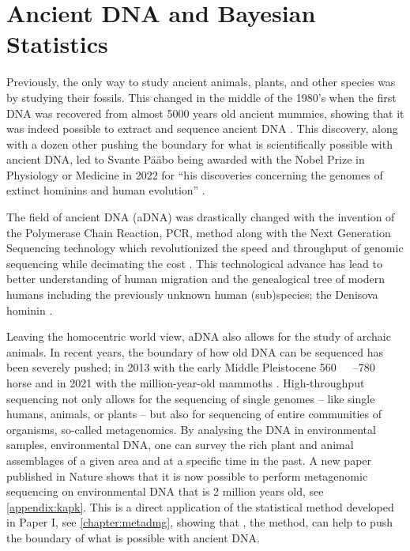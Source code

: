 \section{Ancient DNA and Bayesian Statistics}
\label{section:ancientDNA}

Previously, the only way to study ancient animals, plants, and other species was by studying their fossils. This changed in the middle of the 1980's when the first DNA was recovered from almost 5000 years old ancient mummies, showing that it was indeed possible to extract and sequence ancient DNA \autocite{paaboMolecularCloningAncient1985,paaboPreservationDNAAncient1985}. This discovery, along with a dozen other pushing the boundary for what is scientifically possible with ancient DNA, led to Svante Pääbo being awarded with the Nobel Prize in Physiology or Medicine in 2022 for ``his discoveries concerning the genomes of extinct hominins and human evolution'' \autocite{thenobelassemblyatkarolinskainstitutetNobelPrizePhysiology2022}.

The field of ancient DNA (aDNA) was drastically changed with the invention of the Polymerase Chain Reaction, PCR, method \autocite{mullisSpecificEnzymaticAmplification1986} along with the Next Generation Sequencing technology which revolutionized the speed and throughput of genomic sequencing while decimating the cost \autocite{slatkoOverviewNextGeneration2018}. This technological advance has lead to better understanding of human migration and the genealogical tree of modern humans including the previously unknown human (sub)species; the Denisova hominin \autocite{krauseCompleteMitochondrialDNA2010}.

Leaving the homocentric world view, aDNA also allows for the study of archaic animals. In recent years, the boundary of how old DNA can be sequenced has been severely pushed; in 2013 with the early Middle Pleistocene \qtyrange[range-phrase = --,range-units = single]{560}{780}{\kilo\year\BP} horse \autocite{orlandoRecalibratingEquusEvolution2013} and in 2021 with the million-year-old mammoths \autocite{vandervalkMillionyearoldDNASheds2021}. High-throughput sequencing not only allows for the sequencing of single genomes -- like single humans, animals, or plants -- but also for sequencing of entire communities of organisms, so-called metagenomics. By analysing the DNA in environmental samples, environmental DNA, one can survey the rich plant and animal assemblages of a given area and at a specific time in the past. A new paper published in Nature shows that it is now possible to perform metagenomic sequencing on environmental DNA that is 2 million years old, see \autoref{appendix:kapk}. This is a direct application of the statistical method developed in Paper I, see \autoref{chapter:metadmg}, showing that \metaDMG, the method, can help to push the boundary of what is possible with ancient DNA.

